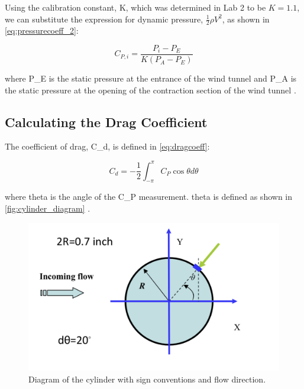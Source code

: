 Using the calibration constant, \gls{K}, which was determined in Lab 2 to be $K = 1.1$, we can substitute the expression for dynamic pressure, $\frac{1}{2}\rho V^2$, as shown in \autoref{eq:pressurecoeff_2}:

\begin{equation}\label{eq:pressurecoeff_2}
    C_{P,i} = \frac{P_i - P_E}{K\left(P_A - P_E\right)}
\end{equation}

\noindent{}where \gls{P_E} is the static pressure at the entrance of the wind tunnel and \gls{P_A} is the static pressure at the opening of the contraction section of the wind tunnel \citep{lab4-manual}.

\subsection{Calculating the Drag Coefficient}

The coefficient of drag, \gls{C_d}, is defined in  \autoref{eq:dragcoeff}:

\begin{equation}\label{eq:dragcoeff}
    C_d = -\frac{1}{2}\int_{-\pi}^{\pi} C_P \cos{\theta}d\theta
\end{equation}

\noindent{}where \gls{theta} is the angle of the \gls{C_P} measurement. \gls{theta} is defined as shown in \autoref{fig:cylinder_diagram} \citep{borgoltz2021}.

\begin{figure}[htpb]
    \centering
    \includegraphics[width=\linewidth]{Figures/Cylinder Diagram.png}
    \caption[Diagram of the cylinder]{Diagram of the cylinder with sign conventions and flow direction.}
    \label{fig:cylinder_diagram}
\end{figure}


